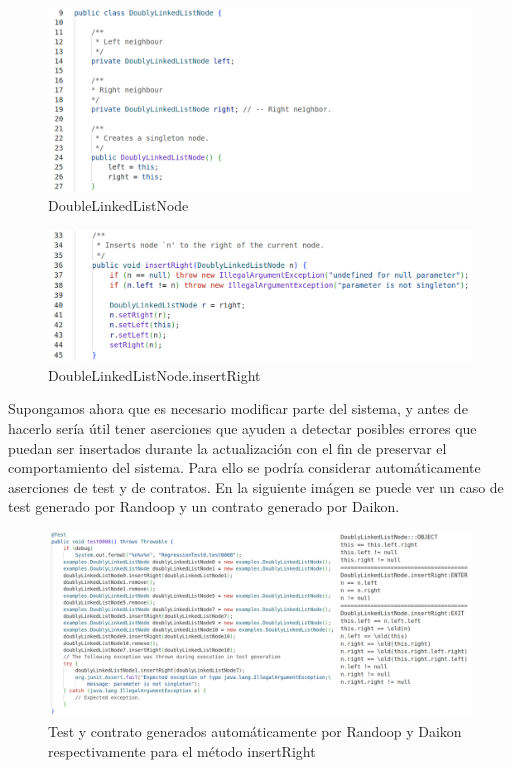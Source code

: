 \begin{figure}[ht]
\centering
\includegraphics[width=1\textwidth]{doublelinkedlistnode/constructor.png}
\caption{DoubleLinkedListNode}
\label{fig:DoubleLinkedListNode}
\end{figure}


\begin{figure}[ht]
\centering
\includegraphics[width=1\textwidth]{doublelinkedlistnode/insertRight.png}
\caption{DoubleLinkedListNode.insertRight}
\label{fig:DoubleLinkedListNodeInsertRight}
\end{figure}

Supongamos ahora que es necesario modificar parte del sistema, y antes de hacerlo sería útil tener aserciones que ayuden a detectar posibles errores que puedan ser insertados durante la actualización con el fin de preservar el comportamiento del sistema.
Para ello se podría considerar automáticamente aserciones de test y de contratos.
En la siguiente imágen se puede ver un caso de test generado por Randoop y un contrato generado por Daikon.

\begin{figure}[ht]
\centering
\includegraphics[width=1\textwidth]{doublelinkedlistnode/randoop-daikon-example.png}
\caption{Test y contrato generados automáticamente por Randoop y Daikon respectivamente para el método insertRight}
\label{fig:DoubleLinkedListNodeTests}
\end{figure}

